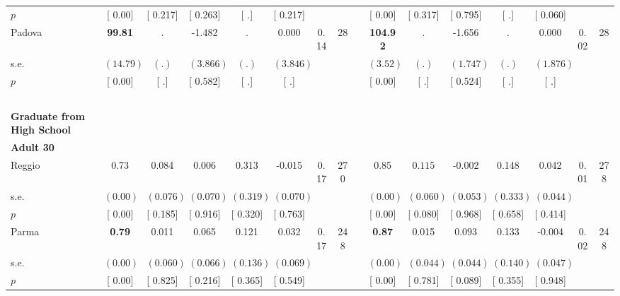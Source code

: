 \begin{longtable}{L{8em} c c c c c c c p{1em} c c c c c c c}
\quad \quad \quad \quad $ p$ & [     0.00] & [    0.217] & [    0.263] & [        .] & [    0.217] & & & & [     0.00] & [    0.317] & [    0.795] & [        .] & [    0.060] & &  \\[1em]
\quad \quad \quad Padova& \textbf{    99.81} &         . &    -1.482 &         . &     0.000 &      0.14 &        28 & & \textbf{   104.92} &         . &    -1.656 &         . &     0.000 &      0.02 &        28  \\*
\quad \quad \quad \quad s.e.& $ (    14.79)$ & $ (        .)$ & $ (    3.866)$ & $ (        .)$ & $ (    3.846)$ & & & & $ (     3.52)$ & $ (        .)$ & $ (    1.747)$ & $ (        .)$ & $ (    1.876)$ & &  \\*
\quad \quad \quad \quad $ p$ & [     0.00] & [        .] & [    0.582] & [        .] & [        .] & & & & [     0.00] & [        .] & [    0.524] & [        .] & [        .] & &  \\[1em]
~\\[1em]
\textbf{Graduate from High School} \\*
\quad \quad \textbf{Adult 30} & & & & & & & & & & & & & & & \\* 
\quad \quad \quad Reggio& 0.73 &     0.084 &     0.006 &     0.313 &    -0.015 &      0.17 &       270 & & 0.85 & $ \mathbf{    0.115}$ &    -0.002 &     0.148 &     0.042 &      0.01 &       278  \\*
\quad \quad \quad \quad s.e.& $ (     0.00)$ & $ (    0.076)$ & $ (    0.070)$ & $ (    0.319)$ & $ (    0.070)$ & & & & $ (     0.00)$ & $ (    0.060)$ & $ (    0.053)$ & $ (    0.333)$ & $ (    0.044)$ & &  \\*
\quad \quad \quad \quad $ p$ & [     0.00] & [    0.185] & [    0.916] & [    0.320] & [    0.763] & & & & [     0.00] & [    0.080] & [    0.968] & [    0.658] & [    0.414] & &  \\[1em]
\quad \quad \quad Parma& \textbf{     0.79} &     0.011 &     0.065 &     0.121 &     0.032 &      0.17 &       248 & & \textbf{     0.87} &     0.015 & $ \mathbf{    0.093}$ &     0.133 &    -0.004 &      0.02 &       248  \\*
\quad \quad \quad \quad s.e.& $ (     0.00)$ & $ (    0.060)$ & $ (    0.066)$ & $ (    0.136)$ & $ (    0.069)$ & & & & $ (     0.00)$ & $ (    0.044)$ & $ (    0.044)$ & $ (    0.140)$ & $ (    0.047)$ & &  \\*
\quad \quad \quad \quad $ p$ & [     0.00] & [    0.825] & [    0.216] & [    0.365] & [    0.549] & & & & [     0.00] & [    0.781] & [    0.089] & [    0.355] & [    0.948] & &  \\[1em]

\end{longtable}
